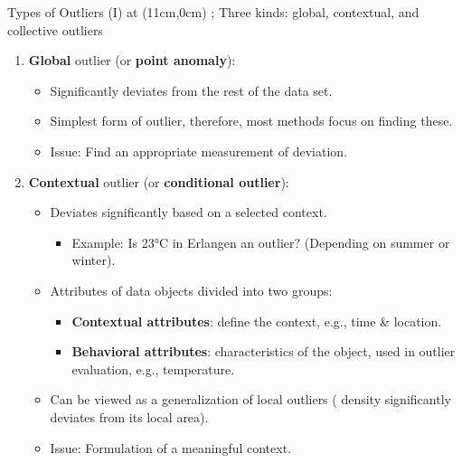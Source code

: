 \begin{frame}{Types of Outliers (I)}
	\tikzoverlay at (11cm,0cm) {};
	Three kinds: global, contextual, and collective outliers
	\begin{enumerate}
		\item \textbf{Global} outlier (or \textbf{\color{faugray}point anomaly}):
		      \begin{itemize}
			      \item Significantly deviates from the rest of the data set.
			      \item Simplest form of outlier, therefore, most methods focus on finding these.
			      \item Issue: Find an appropriate measurement of deviation.
		      \end{itemize}
		\item \textbf{Contextual} outlier (or \textbf{\color{faugray}conditional outlier}):
		      \begin{itemize}
			      \item Deviates significantly based on a selected context.
			            \begin{itemize}
				            \item Example: Is 23°C in Erlangen an outlier? (Depending on summer or winter).
			            \end{itemize}
			      \item Attributes of data objects divided into two groups:
			            \begin{itemize}
				            \item \textbf{Contextual attributes}: define the context, e.g., time \& location.
				            \item \textbf{Behavioral attributes}: characteristics of the object, used in outlier evaluation, e.g., temperature.
			            \end{itemize}
			      \item Can be viewed as a generalization of local outliers ({\color{faugray} density significantly deviates from its local area}).
			      \item Issue: Formulation of a meaningful context.
		      \end{itemize}
	\end{enumerate}
\end{frame}


